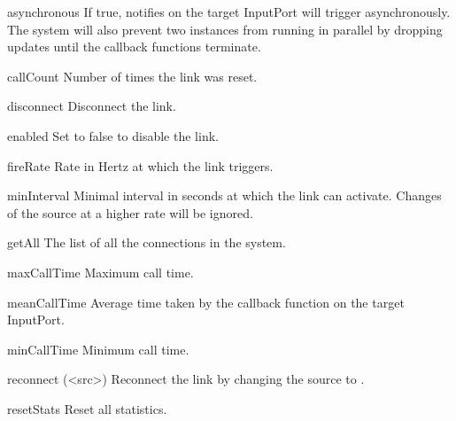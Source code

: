 \begin{urbiscriptapi}
\item[asynchronous]%
  If true, notifies on the target InputPort will trigger asynchronously. The
  system will also prevent two instances from running in parallel by
  dropping updates until the callback functions terminate.

\item[callCount]
  Number of times the link was reset.

\item[disconnect]
  Disconnect the link.

\item[enabled]
  Set to false to disable the link.

\item[fireRate]
  Rate in Hertz at which the link triggers.

\item[minInterval]
  Minimal interval in seconds at which the link can activate. Changes of the
  source at a higher rate will be ignored.

\item[getAll]
  The list of all the connections in the system.

\item[maxCallTime]
  Maximum call time.

\item[meanCallTime]
  Average time taken by the callback function on the target InputPort.

\item[minCallTime]
  Minimum call time.

\item[reconnect](<src>)
  Reconnect the link by changing the source to .

\item[resetStats]
  Reset all statistics.
\end{urbiscriptapi}



